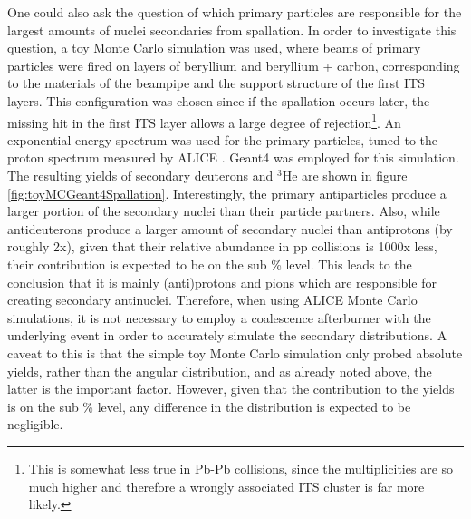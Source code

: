 

One could also ask the question of which primary particles are responsible for the largest amounts of nuclei secondaries from spallation. In order to investigate this question, a toy Monte Carlo simulation was used, where beams of primary particles were fired on layers of beryllium and beryllium + carbon, corresponding to the materials of the beampipe and the support structure of the first ITS layers. This configuration was chosen since if the spallation occurs later, the missing hit in the first ITS layer allows a large degree of rejection\footnote{This is somewhat less true in Pb-Pb collisions, since the multiplicities are so much higher and therefore a wrongly associated ITS cluster is far more likely.}. An exponential energy spectrum was used for the primary particles, tuned to the proton spectrum measured by ALICE \cite{Aamodt:2010dx}. Geant4 was employed for this simulation\cite{GEANT4:2002zbu, Geant4_developments}. The resulting yields of secondary deuterons and $^3\mathrm{He}$ are shown in figure \ref{fig:toyMCGeant4Spallation}. Interestingly, the primary antiparticles produce a larger portion of the secondary nuclei than their particle partners. Also, while antideuterons produce a larger amount of secondary nuclei than antiprotons (by roughly 2x), given that their relative abundance in pp collisions is 1000x less, their contribution is expected to be on the sub \% level. This leads to the conclusion that it is mainly (anti)protons and pions which are responsible for creating secondary antinuclei. Therefore, when using ALICE Monte Carlo simulations, it is not necessary to employ a coalescence afterburner with the underlying event in order to accurately simulate the secondary distributions. A caveat to this is that the simple toy Monte Carlo simulation only probed absolute yields, rather than the angular distribution, and as already noted above, the latter is the important factor. However, given that the contribution to the yields is on the sub \% level, any difference in the distribution is expected to be negligible. 

